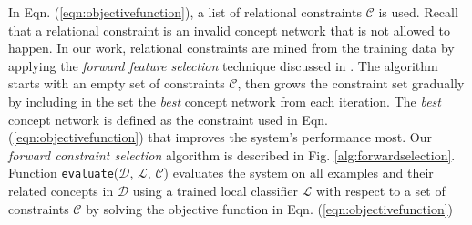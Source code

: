 In Eqn. (\ref{eqn:objectivefunction}), a list of relational
constraints $\mathcal{C}$ is used. Recall that a relational constraint
is an invalid concept network that is not allowed to happen. In our
work, relational constraints are mined from the training data by
applying the {\em forward feature selection} technique discussed in
\cite{944968}. The algorithm starts with an empty set of constraints
$\mathcal{C}$, then grows the constraint set gradually by including in
the set the {\em best} concept network from each iteration. The {\em
  best} concept network is defined as the constraint used in
Eqn. (\ref{eqn:objectivefunction}) that improves the system's
performance most. Our {\em forward constraint selection} algorithm is
described in Fig. \ref{alg:forwardselection}. Function
\texttt{evaluate}($\mathcal{D}$, $\mathcal{L}$, $\mathcal{C}$)
evaluates the system on all examples and their related concepts in
$\mathcal{D}$ using a trained local classifier $\mathcal{L}$ with
respect to a set of constraints $\mathcal{C}$ by solving the objective
function in Eqn. (\ref{eqn:objectivefunction})


